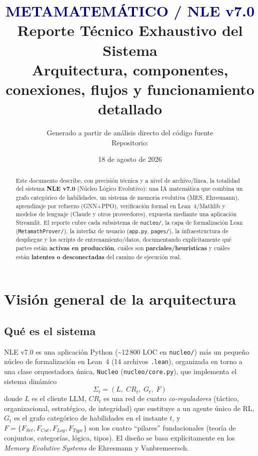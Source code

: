\documentclass[11pt,a4paper]{report}
\title{
  \textcolor{navy}{\Huge\textbf{METAMATEM\'ATICO / NLE v7.0}}\\[6pt]
  {\Large Reporte T\'ecnico Exhaustivo del Sistema}\\[4pt]
  {\large Arquitectura, componentes, conexiones, flujos y funcionamiento detallado}
}
\author{Generado a partir de an\'alisis directo del c\'odigo fuente \\ Repositorio: \code{E:\textbackslash{}Metamatematico\textbackslash{}}}
\date{18 de agosto de 2026}
\newcommand{\code}[1]{\texttt{#1}}
\newcommand{\act}[1]{\textcolor{good}{\textbf{#1}}}
\newcommand{\parc}[1]{\textcolor{warn}{\textbf{#1}}}
\newcommand{\inerte}[1]{\textcolor{bad}{\textbf{#1}}}
\begin{document}
\maketitle

\begin{abstract}
\noindent Este documento describe, con precisi\'on t\'ecnica y a nivel de archivo/l\'inea, la totalidad del sistema \textbf{NLE v7.0} (N\'ucleo L\'ogico Evolutivo): una IA matem\'atica que combina un grafo categ\'orico de habilidades, un sistema de memoria evolutiva (MES, Ehresmann), aprendizaje por refuerzo (GNN+PPO), verificaci\'on formal en Lean~4/Mathlib y modelos de lenguaje (Claude y otros proveedores), expuesta mediante una aplicaci\'on Streamlit. El reporte cubre cada subsistema de \code{nucleo/}, la capa de formalizaci\'on Lean (\code{MetamathProver/}), la interfaz de usuario (\code{app.py}, \code{pages/}), la infraestructura de despliegue y los scripts de entrenamiento/datos, documentando expl\'icitamente qu\'e partes est\'an \act{activas en producci\'on}, cu\'ales son \parc{parciales/heur\'isticas} y cu\'ales est\'an \inerte{latentes o desconectadas} del camino de ejecuci\'on real.
\end{abstract}

\tableofcontents

\chapter{Visi\'on general de la arquitectura}

\section{Qu\'e es el sistema}

NLE v7.0 es una aplicaci\'on Python (\textasciitilde12\,800 LOC en \code{nucleo/}) m\'as un peque\~no n\'ucleo de formalizaci\'on en Lean~4 (14 archivos \code{.lean}), organizada en torno a una clase orquestadora \'unica, \code{Nucleo} (\code{nucleo/core.py}), que implementa el sistema din\'amico
\[
\Sigma_t = (L,\; CR_t,\; G_t,\; F)
\]
donde $L$ es el cliente LLM, $CR_t$ es una red de cuatro \emph{co-reguladores} (t\'actico, organizacional, estrat\'egico, de integridad) que sustituye a un agente \'unico de RL, $G_t$ es el grafo categ\'orico de habilidades en el instante $t$, y $F=\{F_{Set},F_{Cat},F_{Log},F_{Type}\}$ son los cuatro ``pilares'' fundacionales (teor\'ia de conjuntos, categor\'ias, l\'ogica, tipos). El dise\~no se basa expl\'icitamente en los \emph{Memory Evolutive Systems} de Ehresmann y Vanbremeersch.
\end{document}
